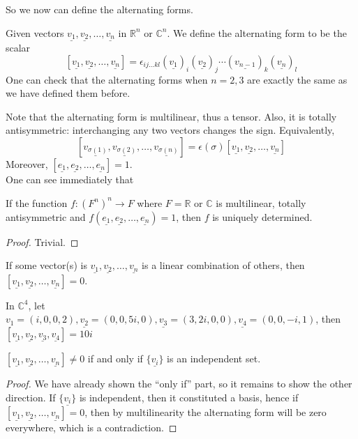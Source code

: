 So we now can define the alternating forms.
\begin{definition}
    Given vectors $\underline{v_1},\underline{v_2},\ldots,\underline{v_n}$ in $\mathbb R^n$ or $\mathbb C^n$.
    We define the alternating form to be the scalar
    $$[\underline{v_1},\underline{v_2},\ldots,\underline{v_n}]=\epsilon_{ij\ldots kl}(\underline{v_1})_i(\underline{v_2})_j\cdots(\underline{v_{n-1}})_k(\underline{v_n})_l$$
    One can check that the alternating forms when $n=2,3$ are exactly the same as we have defined them before.
\end{definition}
Note that the alternating form is multilinear, thus a tensor.
Also, it is totally antisymmetric: interchanging any two vectors changes the sign.
Equivalently,
$$[\underline{v_{\sigma(1)}},\underline{v_{\sigma(2)}},\ldots,\underline{v_{\sigma(n)}}]=\epsilon(\sigma)[\underline{v_1},\underline{v_2},\ldots,\underline{v_n}]$$
Moreover, $[\underline{e_1},\underline{e_2},\ldots,\underline{e_n}]=1$.\\
One can see immediately that
\begin{proposition}
    If the function $f:(F^n)^n\to F$ where $F=\mathbb R$ or $\mathbb C$ is multilinear, totally antisymmetric and $f(\underline{e_1},\underline{e_2},\ldots,\underline{e_n})=1$, then $f$ is uniquely determined.
\end{proposition}
\begin{proof}
    Trivial.
\end{proof}
\begin{proposition}
    If some vector(s) is $\underline{v_1},\underline{v_2},\ldots,\underline{v_n}$ is a linear combination of others, then $[\underline{v_1},\underline{v_2},\ldots,\underline{v_n}]=0$.
\end{proposition}
\begin{example}
    In $\mathbb C^4$, let $\underline{v_1}=(i,0,0,2),\underline{v_2}=(0,0,5i,0),\underline{v_3}=(3,2i,0,0),\underline{v_4}=(0,0,-i,1)$, then $[\underline{v_1},\underline{v_2},\underline{v_3},\underline{v_4}]=10i$
\end{example}
\begin{proposition}
    $[\underline{v_1},\underline{v_2},\ldots,\underline{v_n}]\neq 0$ if and only if $\{\underline{v_i}\}$ is an independent set.
\end{proposition}
\begin{proof}
    We have already shown the ``only if'' part, so it remains to show the other direction.
    If $\{\underline{v_i}\}$ is independent, then it constituted a basis, hence if $[\underline{v_1},\underline{v_2},\ldots,\underline{v_n}]=0$, then by multilinearity the alternating form will be zero everywhere, which is a contradiction.
\end{proof}
